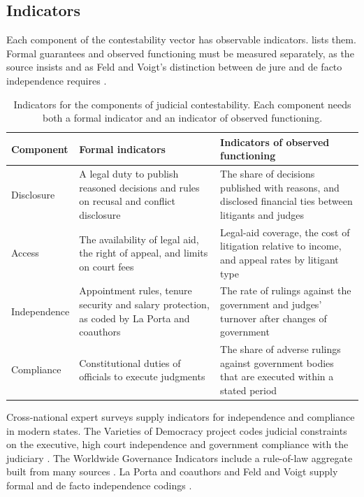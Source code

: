 \documentclass[11pt,letterpaper]{article}
\theoremstyle{definition}
\theoremstyle{remark}
\begin{document}
\subsection{Indicators}

Each component of the contestability vector has observable indicators.  lists them. Formal guarantees and observed functioning must be measured separately, as the source insists and as Feld and Voigt's distinction between de jure and de facto independence requires \citep{largo2026hbs,feld2003}.

\begin{table}[t]
\centering
\small
\caption{Indicators for the components of judicial contestability. Each component needs both a formal indicator and an indicator of observed functioning.}
\label{tab:indicators}
\begin{tabularx}{\textwidth}{L{2.4cm}YY}
\toprule
Component & Formal indicators & Indicators of observed functioning \\
\midrule
Disclosure & A legal duty to publish reasoned decisions and rules on recusal and conflict disclosure & The share of decisions published with reasons, and disclosed financial ties between litigants and judges \\
Access & The availability of legal aid, the right of appeal, and limits on court fees & Legal-aid coverage, the cost of litigation relative to income, and appeal rates by litigant type \\
Independence & Appointment rules, tenure security and salary protection, as coded by La Porta and coauthors & The rate of rulings against the government and judges' turnover after changes of government \\
Compliance & Constitutional duties of officials to execute judgments & The share of adverse rulings against government bodies that are executed within a stated period \\
\bottomrule
\end{tabularx}
\end{table}

Cross-national expert surveys supply indicators for independence and compliance in modern states. The Varieties of Democracy project codes judicial constraints on the executive, high court independence and government compliance with the judiciary \citep{coppedge2011}. The Worldwide Governance Indicators include a rule-of-law aggregate built from many sources \citep{kaufmann2011}. La Porta and coauthors and Feld and Voigt supply formal and de facto independence codings \citep{laporta2004,feld2003}.
\end{document}
